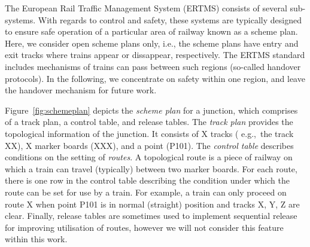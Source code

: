 The European Rail Traffic Management System (ERTMS) consists of
several sub-systems. With regards to control and safety, these systems
are typically designed to ensure safe operation of a particular area
of railway known as a scheme plan. Here, we consider open scheme plans
only, i.e., the scheme plans have entry and exit tracks where trains
appear or dissappear, respectively. The ERTMS standard includes
mechanisms of trains can pass between such regions (so-called handover
protocols). In the following, we concentrate on safety within one
region, and leave the handover mechanism for future work.

Figure~\ref{fig:schemeplan} depicts the \emph{scheme plan} for a
junction, which comprises of a track plan, a control table, and
release tables. The \emph{track plan} provides the topological
information of the junction. It consists of X tracks ( e.g.,\ the
track XX), X marker boards (XXX), and a point (P101). The {\em control
table} describes conditions on the setting of \emph{routes}. A
topological route is a piece of railway on which a train can travel
(typically) between two marker boards. For each route, there is one
row in the control table describing the condition under which the
route can be set for use by a train. For example, a train can only
proceed on route X when point P101 is in normal (straight) position
and tracks X, Y, Z are clear. Finally, release tables are sometimes
used to implement sequential release~\cite{} for improving utilisation
of routes, however we will not consider this feature within this work.

